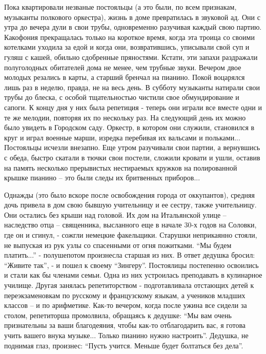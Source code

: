 Пока квартировали незваные постояльцы (а это были, по всем признакам, музыканты
полкового оркестра), жизнь в доме превратилась в звуковой ад. Они с утра до
вечера дули в свои трубы, одновременно разучивая каждый свою партию. Какофония
прекращалась только на короткое время, когда эта троица со своими котелками
уходила за едой и когда они, возвратившись, уписывали свой суп и гуляш с кашей,
обильно сдобренные пряностями. Кстати, эти запахи раздражали полуголодных
обитателей дома не менее, чем трубные звуки. Вечером двое молодых резались в
карты, а старший бренчал на пианино. Покой воцарялся лишь раз в неделю, правда,
не на весь день. В субботу музыканты натирали свои трубы до блеска, с особой
тщательностью чистили свое обмундирование и сапоги. К концу дня у них была
репетиция -  теперь они играли все вместе одни и те же мелодии, повторяя их по
нескольку раз. На следующий день их можно было увидеть в Городском саду.
Оркестр, в котором они служили, становился в круг и играл военные марши,
изредка перебивая их вальсами и польками...  Постояльцы исчезли внезапно. Еще
утром разучивали свои партии, а вернувшись с обеда, быстро скатали в тючки свои
постели, сложили кровати и ушли, оставив на память несколько прерывистых
нестираемых кружков на полированной крышке пианино – это были следы их
бритвенных приборов...

Однажды (это было вскоре после освобождения города от оккупантов), средняя дочь
привела в дом свою бывшую учительницу и ее сестру, также учительницу. Они
остались без крыши над головой. Их дом на Итальянской улице – наследство отца –
священника, высланного еще в начале 30-х годов на Соловки, где он и сгинул, -
сожгли немецкие факельщики. Старушки  неприкаянно стояли, не выпуская из рук
узлы со спасенными от огня пожитками. \enquote{Мы будем платить...} - полушепотом
произнесла старшая из них. В ответ дедушка бросил: \enquote{Живите так}, - и пошел к
своему \enquote{Зингеру}. Постоялицы постепенно освоились и стали как бы членами семьи.
Одна из них устроилась преподавать в кулинарное училище. Другая занялась
репетиторством -  подготавливала отстающих детей к переэкзаменовкам по русскому
и французскому языкам, а учеников младших классов – и по арифметике. Как-то
вечером, когда после ужина все сидели за столом, репетиторша промолвила,
обращаясь к дедушке: \enquote{Мы вам очень признательны за ваши благодеяния, чтобы
как-то отблагодарить вас, я готова учить вашего внука музыке...  Только пианино
нужно настроить}.  Дедушка, не поднимая глаз, произнес: \enquote{Пусть учится. Меньше
будет болтаться без дела}.

